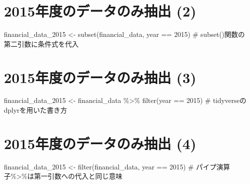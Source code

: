 \documentclass[
  letterpaper,
  DIV=11,
  numbers=noendperiod]{scrreprt}
\newenvironment{Shaded}{\begin{snugshade}}{\end{snugshade}}
\newcommand{\CommentTok}[1]{\textcolor[rgb]{0.37,0.37,0.37}{#1}}
\newcommand{\DecValTok}[1]{\textcolor[rgb]{0.68,0.00,0.00}{#1}}
\newcommand{\FunctionTok}[1]{\textcolor[rgb]{0.28,0.35,0.67}{#1}}
\newcommand{\NormalTok}[1]{\textcolor[rgb]{0.00,0.23,0.31}{#1}}
\newcommand{\OtherTok}[1]{\textcolor[rgb]{0.00,0.23,0.31}{#1}}
\newcommand{\SpecialCharTok}[1]{\textcolor[rgb]{0.37,0.37,0.37}{#1}}
\begin{document}
\begin{Shaded}
\end{Shaded}

\section{2015年度のデータのみ抽出
(2)}\label{ux5e74ux5ea6ux306eux30c7ux30fcux30bfux306eux307fux62bdux51fa-2}

\begin{Shaded}
\begin{Highlighting}[]
\NormalTok{financial\_data\_2015 }\OtherTok{\textless{}{-}} \FunctionTok{subset}\NormalTok{(financial\_data, year }\SpecialCharTok{==} \DecValTok{2015}\NormalTok{) }\CommentTok{\# subset()関数の第二引数に条件式を代入}
\end{Highlighting}
\end{Shaded}

\section{2015年度のデータのみ抽出
(3)}\label{ux5e74ux5ea6ux306eux30c7ux30fcux30bfux306eux307fux62bdux51fa-3}

\begin{Shaded}
\begin{Highlighting}[]
\NormalTok{financial\_data\_2015 }\OtherTok{\textless{}{-}}\NormalTok{ financial\_data }\SpecialCharTok{\%\textgreater{}\%} \FunctionTok{filter}\NormalTok{(year }\SpecialCharTok{==} \DecValTok{2015}\NormalTok{) }\CommentTok{\# tidyverseのdplyrを用いた書き方}
\end{Highlighting}
\end{Shaded}

\section{2015年度のデータのみ抽出
(4)}\label{ux5e74ux5ea6ux306eux30c7ux30fcux30bfux306eux307fux62bdux51fa-4}

\begin{Shaded}
\begin{Highlighting}[]
\NormalTok{financial\_data\_2015 }\OtherTok{\textless{}{-}} \FunctionTok{filter}\NormalTok{(financial\_data, year }\SpecialCharTok{==} \DecValTok{2015}\NormalTok{) }\CommentTok{\# パイプ演算子\%\textgreater{}\%は第一引数への代入と同じ意味}
\end{Highlighting}
\end{Shaded}
\end{document}
